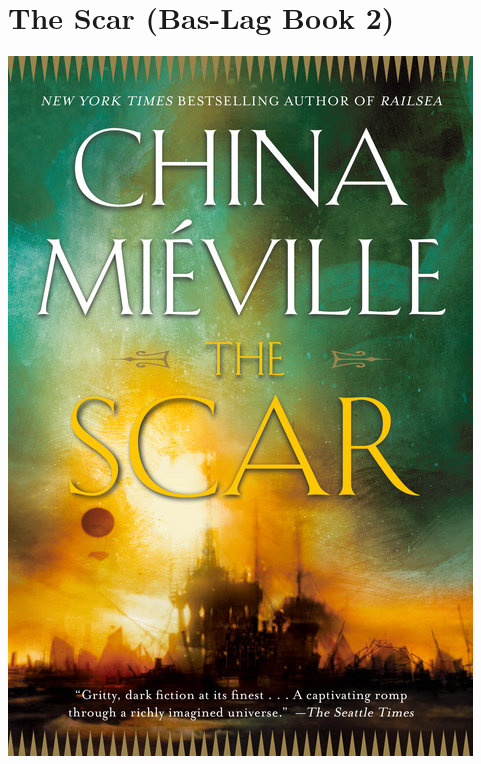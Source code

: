\documentclass{tufte-handout}
\makeatletter
\newcommand{\varcaption}[2][0pt]{%
  \gsetlength{\@tufte@caption@vertical@offset}{-#1}%
  \gdef\@tufte@stored@varcaption{#2}%
}
\gdef\@tufte@stored@varcaption{} %
\makeatother
\begin{document}
\section*{The Scar (Bas-Lag Book 2)}
\begin{marginfigure}[\baselineskip]
   \includegraphics[width=\linewidth]{images/scar.jpg}
   \varcaption{\href{https://www.penguinrandomhouse.com/books/114264/the-scar-by-china-mieville/9780345444387/}{Publisher Link}, \href{https://www.amazon.com/Scar-Bas-Lag-China-Miéville/dp/0345444388}{Amazon Link}}
\end{marginfigure}
\end{document}
